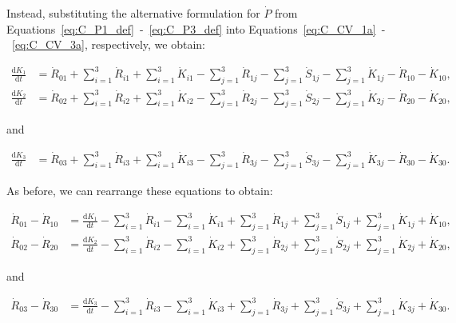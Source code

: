 Instead,
substituting the alternative formulation for $\dot{P}$
from Equations~\ref{eq:C_P1_def}~-~\ref{eq:C_P3_def}
into Equations~\ref{eq:C_CV_1a}~-~\ref{eq:C_CV_3a},
respectively,
we obtain:

\begin{align} \label{eq:C_CV_1c}
	\frac{\mathrm{d}K_{1}}{\mathrm{d}t}	&
	= \dot{R}_{01}
	+ \sum_{i = 1}^{3}\dot{R}_{i1}
	+ \sum_{i = 1}^{3}\dot{K}_{i1}
	- \sum_{j = 1}^{3}\dot{R}_{1j}
	- \sum_{j = 1}^{3}\dot{S}_{1j}
	- \sum_{j = 1}^{3}\dot{K}_{1j}
	- \dot{R}_{10} 
	- \dot{K}_{10},										\\
	\label{eq:C_CV_2c}
	\frac{\mathrm{d}K_{2}}{\mathrm{d}t}	& 
	=  \dot{R}_{02} 
	+ \sum_{i = 1}^{3}\dot{R}_{i2}
	+ \sum_{i = 1}^{3}\dot{K}_{i2}
	- \sum_{j = 1}^{3}\dot{R}_{2j}
	- \sum_{j = 1}^{3}\dot{S}_{2j}
	- \sum_{j = 1}^{3}\dot{K}_{2j}
	- \dot{R}_{20} 
	- \dot{K}_{20},
\end{align}

\noindent{}and

\begin{align}
	\label{eq:C_CV_3c}
	\frac{\mathrm{d}K_{3}}{\mathrm{d}t}	&
	=  \dot{R}_{03} 
	+ \sum_{i = 1}^{3}\dot{R}_{i3}
	+ \sum_{i = 1}^{3}\dot{K}_{i3}
	- \sum_{j = 1}^{3}\dot{R}_{3j}
	- \sum_{j = 1}^{3}\dot{S}_{3j}
	- \sum_{j = 1}^{3}\dot{K}_{3j}
	- \dot{R}_{30} 
	- \dot{K}_{30}.										
\end{align}

As before, we can rearrange these equations
to obtain:

\begin{align} \label{eq:C_CV_1d}
	\dot{R}_{01}
	- \dot{R}_{10} 											&
	=\frac{\mathrm{d}K_{1}}{\mathrm{d}t}
	- \sum_{i = 1}^{3}\dot{R}_{i1}
	- \sum_{i = 1}^{3}\dot{K}_{i1}
	+ \sum_{j = 1}^{3}\dot{R}_{1j}
	+ \sum_{j = 1}^{3}\dot{S}_{1j}
	+ \sum_{j = 1}^{3}\dot{K}_{1j}
	+ \dot{K}_{10},											\\
	\label{eq:C_CV_2d}
	\dot{R}_{02} 
	- \dot{R}_{20} 											&
	= \frac{\mathrm{d}K_{2}}{\mathrm{d}t}
	- \sum_{i = 1}^{3}\dot{R}_{i2}
	- \sum_{i = 1}^{3}\dot{K}_{i2}
	+ \sum_{j = 1}^{3}\dot{R}_{2j}
	+ \sum_{j = 1}^{3}\dot{S}_{2j}
	+ \sum_{j = 1}^{3}\dot{K}_{2j}
	+ \dot{K}_{20},
\end{align}

\noindent{}and

\begin{align}
	\label{eq:C_CV_3d}
	\dot{R}_{03}
	- \dot{R}_{30} 											&
	= \frac{\mathrm{d}K_{3}}{\mathrm{d}t}
	- \sum_{i = 1}^{3}\dot{R}_{i3}
	- \sum_{i = 1}^{3}\dot{K}_{i3}
	+ \sum_{j = 1}^{3}\dot{R}_{3j}
	+ \sum_{j = 1}^{3}\dot{S}_{3j}
	+ \sum_{j = 1}^{3}\dot{K}_{3j}
	+ \dot{K}_{30}.										
\end{align}

